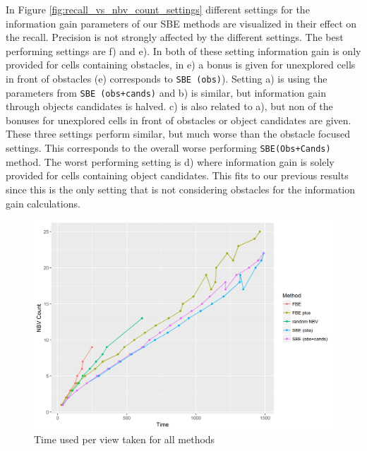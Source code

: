 \documentclass[a4paper,11pt,english]{article}
\begin{document}
In Figure \ref{fig:recall_vs_nbv_count_settings} different settings for the information gain parameters of our SBE methods are visualized in their effect on the recall. Precision is not strongly affected by the different settings.
The best performing settings are f) and e). In both of these setting information gain is only provided for cells containing obstacles, in e) a bonus is given for unexplored cells in front of obstacles (e) corresponds to \texttt{SBE (obs)}).
Setting a) is using the parameters from \texttt{SBE (obs+cands)} and b) is similar, but information gain through objects candidates is halved. c) is also related to a), but non of the bonuses for unexplored cells in front of obstacles or object candidates are given. These three settings perform similar, but much worse than the obstacle focused settings. This corresponds to the overall worse performing \texttt{SBE(Obs+Cands)} method.
The worst performing setting is d) where information gain is solely provided for cells containing object candidates. This fits to our previous results since this is the only setting that is not considering obstacles for the information gain calculations.


\begin{figure}[h]
	\begin{center}
		\includegraphics[width=\textwidth]{src/Plots/nbv_count_vs_time.png}
		\caption{Time used per view taken for all methods}
		\label{fig:nbv_count_vs_time}
	\end{center}
\end{figure}
\end{document}
